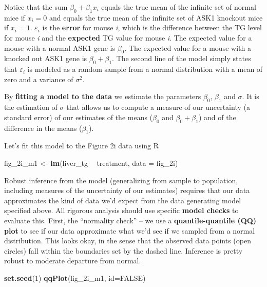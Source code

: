 \documentclass[]{book}
\newenvironment{Shaded}{\begin{snugshade}}{\end{snugshade}}
\newcommand{\DataTypeTok}[1]{\textcolor[rgb]{0.13,0.29,0.53}{#1}}
\newcommand{\DecValTok}[1]{\textcolor[rgb]{0.00,0.00,0.81}{#1}}
\newcommand{\KeywordTok}[1]{\textcolor[rgb]{0.13,0.29,0.53}{\textbf{#1}}}
\newcommand{\NormalTok}[1]{#1}
\newcommand{\OperatorTok}[1]{\textcolor[rgb]{0.81,0.36,0.00}{\textbf{#1}}}
\newcommand{\OtherTok}[1]{\textcolor[rgb]{0.56,0.35,0.01}{#1}}
\newcommand{\StringTok}[1]{\textcolor[rgb]{0.31,0.60,0.02}{#1}}
\begin{document}
Notice that the sum \(\beta_0 + \beta_1 x_i\) equals the true mean of the infinite set of normal mice if \(x_i = 0\) and equals the true mean of the infinite set of ASK1 knockout mice if \(x_i = 1\). \(\varepsilon_i\) is the \textbf{error} for mouse \emph{i}, which is the difference between the TG level for mouse \emph{i} and the \textbf{expected} TG value for mouse \emph{i}. The expected value for a mouse with a normal ASK1 gene is \(\beta_0\). The expected value for a mouse with a knocked out ASK1 gene is \(\beta_0 + \beta_1\). The second line of the model simply states that \(\varepsilon_i\) is modeled as a random sample from a normal distribution with a mean of zero and a variance of \(\sigma^2\).

By \textbf{fitting a model to the data} we estimate the parameters \(\beta_0\), \(\beta_1\) and \(\sigma\). It is the estimation of \(\sigma\) that allows us to compute a measure of our uncertainty (a standard error) of our estimates of the means (\(\beta_0\) and \(\beta_0 + \beta_1\)) and of the difference in the means (\(\beta_1\)).

Let's fit this model to the Figure 2i data using R

\begin{Shaded}
\begin{Highlighting}[]
\NormalTok{fig_2i_m1 <-}\StringTok{ }\KeywordTok{lm}\NormalTok{(liver_tg }\OperatorTok{~}\StringTok{ }\NormalTok{treatment, }\DataTypeTok{data =}\NormalTok{ fig_2i)}
\end{Highlighting}
\end{Shaded}

Robust inference from the model (generalizing from sample to population, including measures of the uncertainty of our estimates) requires that our data approximates the kind of data we'd expect from the data generating model specified above. All rigorous analysis should use specific \textbf{model checks} to evaluate this. First, the ``normality check'' -- we use a \textbf{quantile-quantile (QQ) plot} to see if our data approximate what we'd see if we sampled from a normal distribution. This looks okay, in the sense that the observed data points (open circles) fall within the boundaries set by the dashed line. Inference is pretty robust to moderate departure from normal.

\begin{Shaded}
\begin{Highlighting}[]
\KeywordTok{set.seed}\NormalTok{(}\DecValTok{1}\NormalTok{)}
\KeywordTok{qqPlot}\NormalTok{(fig_2i_m1, }\DataTypeTok{id=}\OtherTok{FALSE}\NormalTok{)}
\end{Highlighting}
\end{Shaded}
\end{document}
